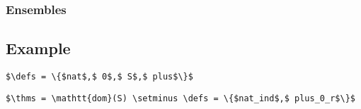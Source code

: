 \subsubsection{Ensembles}

\subsection{Example}

\begin{lstlisting}[language=Coq, mathescape, frame=none]
$\defs = \{$nat$,$ 0$,$ S$,$ plus$\}$
\end{lstlisting}

\begin{lstlisting}[language=Coq, mathescape, frame=none]
$\thms = \mathtt{dom}(S) \setminus \defs = \{$nat_ind$,$ plus_0_r$\}$
\end{lstlisting}

